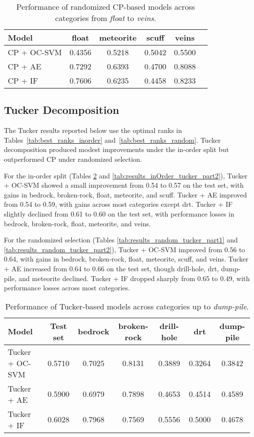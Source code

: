\documentclass[11pt]{article}
\begin{document}
\begin{table}[h!]
\centering
\begin{tabular}{lccccc}
\hline
\textbf{Model} & \textbf{float} & \textbf{meteorite} & \textbf{scuff} & \textbf{veins} \\
\hline
CP + OC-SVM & 0.4356 & 0.5218 & 0.5042 & 0.5500 \\
CP + AE     & 0.7292 & 0.6393 & 0.4700 & 0.8088 \\
CP + IF     & 0.7606 & 0.6235 & 0.4458 & 0.8233 \\
\hline
\end{tabular}
\caption{Performance of randomized CP-based models across categories from \textit{float} to \textit{veins}.}
\label{tab:random_cp_results_part2}
\end{table}

\subsection{Tucker Decomposition}
The Tucker results reported below use the optimal ranks in Tables~\ref{tab:best_ranks_inorder} and~\ref{tab:best_ranks_random}. Tucker decomposition produced modest improvements under the in-order split but outperformed CP under randomized selection.  

For the in-order split (Tables \ref{tab:results_inOrder_tucker_part1} and \ref{tab:results_inOrder_tucker_part2}), Tucker + OC-SVM showed a small improvement from 0.54 to 0.57 on the test set, with gains in bedrock, broken-rock, float, meteorite, and scuff. Tucker + AE improved from 0.54 to 0.59, with gains across most categories except drt. Tucker + IF slightly declined from 0.61 to 0.60 on the test set, with performance losses in bedrock, broken-rock, float, meteorite, and veins.  

For the randomized selection (Tables \ref{tab:results_random_tucker_part1} and \ref{tab:results_random_tucker_part2}), Tucker + OC-SVM improved from 0.56 to 0.64, with gains in bedrock, broken-rock, float, meteorite, scuff, and veins. Tucker + AE increased from 0.64 to 0.66 on the test set, though drill-hole, drt, dump-pile, and meteorite declined. Tucker + IF dropped sharply from 0.65 to 0.49, with performance losses across most categories.  

\begin{table}[h!]
\centering
\begin{tabular}{lcccccc}
\hline
\textbf{Model} & \textbf{Test set} & \textbf{bedrock} & \textbf{broken-rock} & \textbf{drill-hole} & \textbf{drt} & \textbf{dump-pile} \\
\hline
Tucker + OC-SVM & 0.5710 & 0.7025 & 0.8131 & 0.3889 & 0.3264 & 0.3842 \\
Tucker + AE     & 0.5900 & 0.6979 & 0.7898 & 0.4653 & 0.4514 & 0.4589 \\
Tucker + IF     & 0.6028 & 0.7968 & 0.7569 & 0.5556 & 0.5000 & 0.4678 \\
\hline
\end{tabular}
\caption{Performance of Tucker-based models across categories up to \textit{dump-pile}.}
\label{tab:results_inOrder_tucker_part1}
\end{table}
\end{document}
